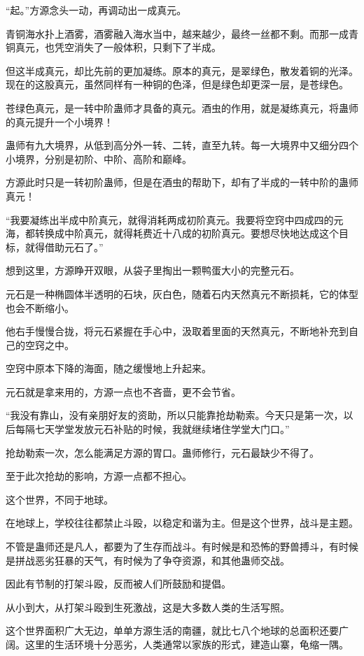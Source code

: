 \begin{this_body}
“起。”方源念头一动，再调动出一成真元。

青铜海水扑上酒雾，酒雾融入海水当中，越来越少，最终一丝都不剩。而那一成青铜真元，也凭空消失了一般体积，只剩下了半成。

但这半成真元，却比先前的更加凝练。原本的真元，是翠绿色，散发着铜的光泽。现在的这股真元，虽然同样有一种铜的色泽，但是绿色却更深一层，是苍绿色。

苍绿色真元，是一转中阶蛊师才具备的真元。酒虫的作用，就是凝练真元，将蛊师的真元提升一个小境界！

蛊师有九大境界，从低到高分外一转、二转，直至九转。每一大境界中又细分四个小境界，分别是初阶、中阶、高阶和巅峰。

方源此时只是一转初阶蛊师，但是在酒虫的帮助下，却有了半成的一转中阶的蛊师真元！

“我要凝练出半成中阶真元，就得消耗两成初阶真元。我要将空窍中四成四的元海，都转换成中阶真元，就得耗费近十八成的初阶真元。要想尽快地达成这个目标，就得借助元石了。”

想到这里，方源睁开双眼，从袋子里掏出一颗鸭蛋大小的完整元石。

元石是一种椭圆体半透明的石块，灰白色，随着石内天然真元不断损耗，它的体型也会不断缩小。

他右手慢慢合拢，将元石紧握在手心中，汲取着里面的天然真元，不断地补充到自己的空窍之中。

空窍中原本下降的海面，随之缓慢地上升起来。

元石就是拿来用的，方源一点也不吝啬，更不会节省。

“我没有靠山，没有亲朋好友的资助，所以只能靠抢劫勒索。今天只是第一次，以后每隔七天学堂发放元石补贴的时候，我就继续堵住学堂大门口。”

抢劫勒索一次，怎么能满足方源的胃口。蛊师修行，元石最缺少不得了。

至于此次抢劫的影响，方源一点都不担心。

这个世界，不同于地球。

在地球上，学校往往都禁止斗殴，以稳定和谐为主。但是这个世界，战斗是主题。

不管是蛊师还是凡人，都要为了生存而战斗。有时候是和恐怖的野兽搏斗，有时候是拼战恶劣狂暴的天气，有时候为了争夺资源，和其他蛊师交战。

因此有节制的打架斗殴，反而被人们所鼓励和提倡。

从小到大，从打架斗殴到生死激战，这是大多数人类的生活写照。

这个世界面积广大无边，单单方源生活的南疆，就比七八个地球的总面积还要广阔。这里的生活环境十分恶劣，人类通常以家族的形式，建造山寨，龟缩一隅。


\end{this_body}
